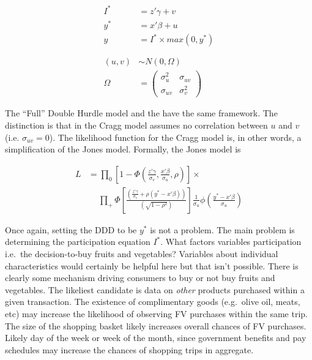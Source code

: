 \documentclass[12pt,letterpaperpaper,]{book}
\begin{document}
\[
\begin{aligned}
I^* &= z'\gamma + v \\
y^* &= x'\beta + u  \\
y   &= I^* \times max(0, y^*) \\
& \phantom{x}\\
(u,v) & \sim N(0,\Omega) \\
\Omega & = {\left ( 
\begin{array}{cc}
  \sigma^2_{u} & \sigma_{uv} \\
  \sigma_{uv} & \sigma^2_{v} 
\end{array}
\right )}
\end{aligned}
\label{eq:dhurdle}
\]

The \citet{jones_double-hurdle_1989} ``Full'' Double Hurdle model and
the \citet{cragg_statistical_1971} have the same framework. The
distinction is that in the Cragg model assumes no correlation between
\(u\) and \(v\) (i.e. \(\sigma_{uv} = 0\)). The likelihood function for
the Cragg model is, in other words, a simplification of the Jones model.
Formally, the Jones model is

\[
\begin{aligned}
L &= \prod_0 
  \left [
    1 - \Phi 
    \left ( 
      \frac{z'\gamma}{\sigma_v},
      \frac{x'\beta}{\sigma_u},
      \rho
    \right ) 
  \right ] \times \\
& \quad ~ \prod_{+} \Phi
  \left [ 
      \frac{ \left ( 
        \frac{z'\gamma}{\sigma_v} + 
        \rho(y^* - x'\beta) \right )}
         {\left ( \sqrt{1 - \rho^2} \right ) } \right ]
\frac{1}{\sigma_u} \phi \left ( \frac{y^* - x'\beta}{\sigma_u} \right )
\end{aligned}
\label{eq:lhurdle}
\]

Once again, setting the DDD to be \(y^*\) is not a problem. The main
problem is determining the participation equation \(I^*\). What factors
variables participation i.e.~the decision-to-buy fruits and vegetables?
Variables about individual characteristics would certainly be helpful
here but that isn't possible. There is clearly some mechanism driving
consumers to buy or not buy fruits and vegetables. The likeliest
candidate is data on \emph{other} products purchased within a given
transaction. The existence of complimentary goods (e.g.~olive oil,
meats, etc) may increase the likelihood of observing FV purchases within
the same trip. The size of the shopping basket likely increases overall
chances of FV purchases. Likely day of the week or week of the month,
since government benefits and pay schedules may increase the chances of
shopping trips in aggregate.
\end{document}
